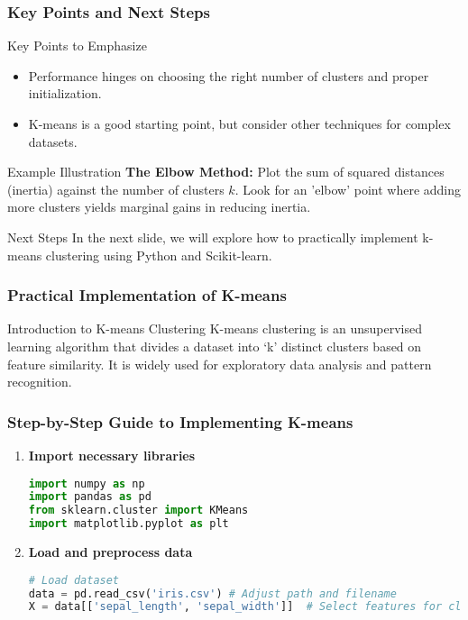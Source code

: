 \documentclass[aspectratio=169]{beamer}
\begin{document}
\begin{frame}[fragile]
  \frametitle{Key Points and Next Steps}
  \begin{block}{Key Points to Emphasize}
    \begin{itemize}
      \item Performance hinges on choosing the right number of clusters and proper initialization.
      \item K-means is a good starting point, but consider other techniques for complex datasets.
    \end{itemize}
  \end{block}

  \medskip

  \begin{block}{Example Illustration}
    \textbf{The Elbow Method:} Plot the sum of squared distances (inertia) against the number of clusters \(k\). Look for an 'elbow' point where adding more clusters yields marginal gains in reducing inertia.
  \end{block}

  \medskip

  \begin{block}{Next Steps}
    In the next slide, we will explore how to practically implement k-means clustering using Python and Scikit-learn.
  \end{block}
\end{frame}

\begin{frame}
    \frametitle{Practical Implementation of K-means}
    \begin{block}{Introduction to K-means Clustering}
        K-means clustering is an unsupervised learning algorithm that divides a dataset into ‘k’ distinct clusters based on feature similarity. 
        It is widely used for exploratory data analysis and pattern recognition.
    \end{block}
\end{frame}

\begin{frame}[fragile]
    \frametitle{Step-by-Step Guide to Implementing K-means}
    \begin{enumerate}
        \item \textbf{Import necessary libraries}
        \begin{lstlisting}[language=Python]
import numpy as np
import pandas as pd
from sklearn.cluster import KMeans
import matplotlib.pyplot as plt
        \end{lstlisting}
        
        \item \textbf{Load and preprocess data}
        \begin{lstlisting}[language=Python]
# Load dataset
data = pd.read_csv('iris.csv') # Adjust path and filename
X = data[['sepal_length', 'sepal_width']]  # Select features for clustering
        \end{lstlisting}
    \end{enumerate}
\end{frame}
\end{document}
